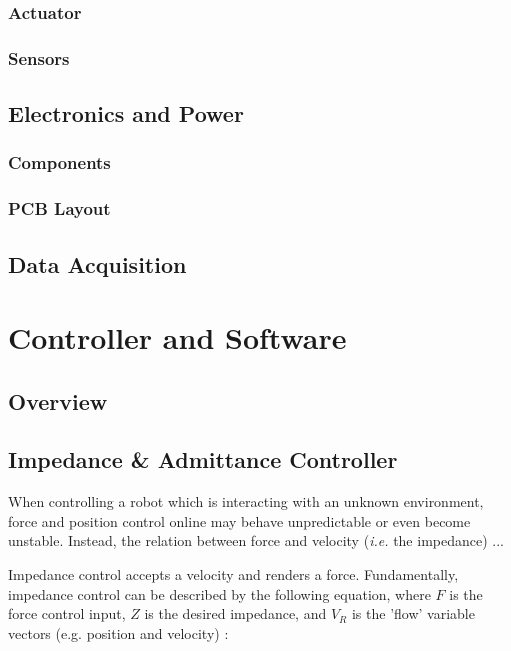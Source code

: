 \documentclass[12pt]{report}
\begin{document}
		\subsection{Actuator}
		\subsection{Sensors}
	\section{Electronics and Power}
		\subsection{Components}
		\subsection{PCB Layout}
	\section{Data Acquisition} 


\chapter{Controller and Software}

	\section{Overview}
	\section{Impedance \& Admittance Controller}

%

When controlling a robot which is interacting with an unknown environment, force and position control online may behave unpredictable or even become unstable. Instead, the relation between force and velocity (\textit{i.e.} the impedance) ...


Impedance control accepts a velocity and renders a force. Fundamentally, impedance control can be described by the following equation, where $F$ is the force control input, $Z$ is the desired impedance, and $V_R$ is the 'flow' variable vectors (e.g. position and velocity) :
\end{document}
